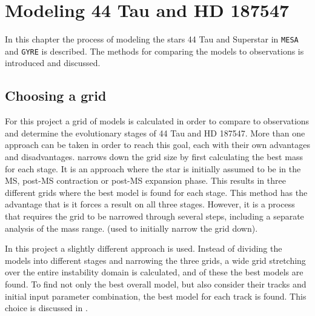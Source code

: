 \chapter{Modeling 44 Tau and HD 187547}
\label{modeling}
In this chapter the process of modeling the stars 44 Tau and Superstar in \texttt{MESA} and \texttt{GYRE} is described. The methods for comparing the models to  observations is introduced and discussed.

\section{Choosing a grid}
\label{sec:grid}
For this project a grid of models is calculated in order to compare to observations and determine the evolutionary stages of 44 Tau and HD 187547. More than one approach can be taken in order to reach this goal, each with their own advantages and disadvantages. \citet{lenz2010delta} narrows down the grid size by first calculating the best mass for each stage. It is an approach where the star is initially assumed to be in the MS, post-MS contraction or post-MS expansion phase. This results in three different grids where the best model is found for each stage. This method has the advantage that is it forces a result on all three stages. However, it is a process that requires the grid to be narrowed through several steps, including a separate analysis of the mass range. (used to initially narrow the grid down). 

In this project a slightly different approach is used. Instead of dividing the models into different stages and narrowing the three grids, a wide grid stretching over the entire instability domain is calculated, and of these the best models are found. To find not only the best overall model, but also consider their tracks and initial input parameter combination, the best model for each track is found. This choice is discussed in . 

